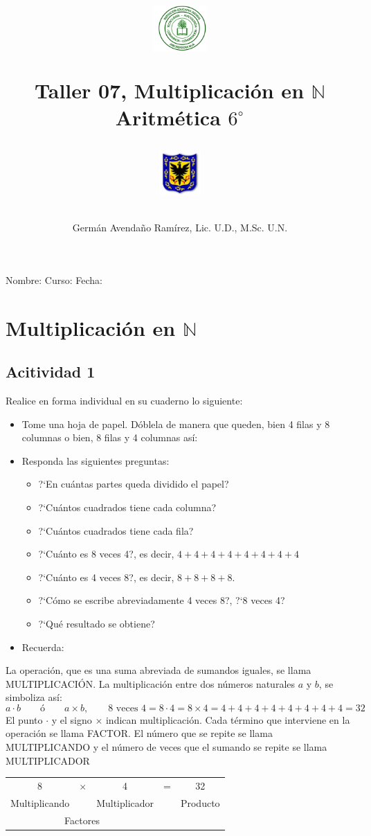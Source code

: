 \documentclass[10pt,twoside]{article}
\author{Germ\'an Avenda\~no Ram\'irez, Lic. U.D., M.Sc. U.N.}
\title{\begin{minipage}{.2\textwidth}
\includegraphics[height=1.75cm]{Images/logo-colegio.png}\end{minipage}
\begin{minipage}{.55\textwidth}
\begin{center}
Taller 07, Multiplicación en $\mathbb{N}$ \\
Aritm\'etica $6^{\circ}$
\end{center}
\end{minipage}\hfill
\begin{minipage}{.2\textwidth}
\includegraphics[height=1.75cm]{Images/logo-sed.png} 
\end{minipage}}
\date{}
\begin{document}
\maketitle
Nombre: \hrulefill Curso: \underline{\hspace*{44pt}} Fecha: \underline{\hspace*{2.5cm}}
\section*{Multiplicaci\'on en $\mathbb{N}$}
\subsection*{Acitividad 1}
Realice en forma individual en su cuaderno lo siguiente:
\begin{itemize}
 \item Tome una hoja de papel. D\'oblela de manera que queden, bien 4 filas y 8 columnas o bien, 8 filas y 4 columnas as\'i:
\begin{center}
\end{center}
\item Responda las siguientes preguntas:
\begin{itemize}
 \item ?`En cu\'antas partes queda dividido el papel?
\item ?`Cu\'antos cuadrados tiene cada columna?
\item ?`Cu\'antos cuadrados tiene cada fila?
\item ?`Cu\'anto es 8 veces 4?, es decir, $4+4+4+4+4+4+4+4$
\item ?`Cu\'anto es 4 veces 8?, es decir, $8+8+8+8$.
\item ?`C\'omo se escribe abreviadamente 4 veces 8?, ?`8 veces 4?
\item ?`Qu\'e resultado se obtiene?
\end{itemize}
\item Recuerda:
\end{itemize}
La operación, que es una suma abreviada de sumandos iguales, se llama MULTIPLICACIÓN.
La multiplicación entre dos números naturales $a$ y $b$, se simboliza así:
\[a\cdot b \qquad \text{ó} \qquad a\times b, \qquad \mbox{8 veces 4}=8\cdot 4=8\times 4=4+4+4+4+4+4+4+4=32\]
El punto $\cdot$ y el signo $\times$ indican multiplicación. Cada término que interviene en la
operación se llama FACTOR. El número que se repite se llama MULTIPLICANDO y
el número de veces que el sumando se repite se llama MULTIPLICADOR
\begin{center}
\begin{tabular}{ccccc}
8 & $\times$ & 4 & = & 32 \\ 
Multiplicando &  & Multiplicador &  & Producto \\ 
\multicolumn{3}{c}{Factores}   &  &  \\ 
\end{tabular} 
\end{center}
\end{document}
